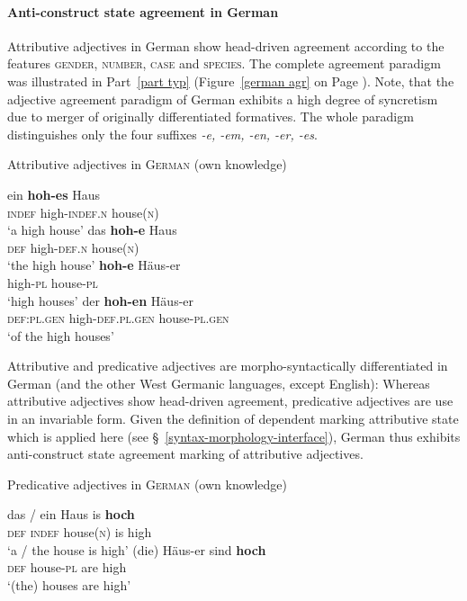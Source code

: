 \paragraph{Anti-construct state agreement in German}
Attributive adjectives in German show head-driven agreement according to the features \textsc{gender, number, case} and \textsc{species}. The complete agreement paradigm was illustrated in Part~\ref{part typ} (Figure~\ref{german agr} on Page \pageref{german agr}). Note, that the adjective agreement paradigm of German exhibits a high degree of syncretism due to merger of originally differentiated formatives. The whole paradigm distinguishes only the four suffixes \textit{-e, -em, -en, -er, -es}.
\begin{exe}
\ex Attributive adjectives in \textsc{German} (own knowledge)
\begin{xlist}
\ex
\gll	ein \textbf{hoh-es} Haus\\
	\textsc{indef} high-\textsc{indef.n} house(\textsc{n})\\
\glt	‘a high house’
\ex	
\gll	das \textbf{hoh-e} Haus\\
	\textsc{def} high-\textsc{def.n} house(\textsc{n})\\
\glt	‘the high house’
\ex	
\gll	\textbf{hoh-e} Häus-er\\
	high-\textsc{pl} house-\textsc{pl}\\
\glt	‘high houses’
\ex	
\gll	der \textbf{hoh-en} Häus-er\\
	\textsc{def:pl.gen} high-\textsc{def.pl.gen} house-\textsc{pl.gen}\\
\glt	‘of the high houses’
\end{xlist}
\end{exe}
Attributive and predicative adjectives are morpho-syntactically differentiated in German (and the other West Germanic languages, except English):  Whereas attributive adjectives show head-driven agreement, predicative adjectives are use in an invariable form. Given the definition of dependent marking attributive state which is applied here (see \S~\ref{syntax-morphology-interface}), German thus exhibits anti-construct state agreement marking of attributive adjectives.
\begin{exe}
\ex Predicative adjectives in \textsc{German} (own knowledge)
\begin{xlist}
\ex
\gll	das / ein Haus is \textbf{hoch}\\
	\textsc{def} {} \textsc{indef} house(\textsc{n}) is high\\
\glt	‘a / the house is high’
\ex	
\gll	(die) Häus-er sind \textbf{hoch}\\
	\textsc{def} house-\textsc{pl} are high\\
\glt	‘(the) houses are high’
\end{xlist}
\end{exe}

